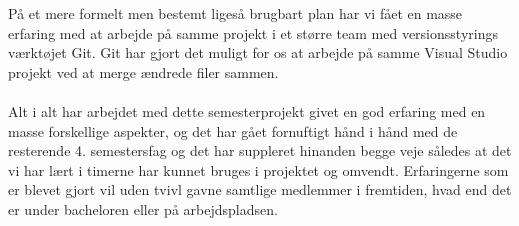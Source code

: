 På et mere formelt men bestemt ligeså brugbart plan har vi fået en masse erfaring med at arbejde på samme projekt i et større team med versionsstyrings værktøjet Git. Git har gjort det muligt for os at arbejde på samme Visual Studio projekt ved at merge ændrede filer sammen. \\

\\
Alt i alt har arbejdet med dette semesterprojekt givet en god erfaring med en masse forskellige aspekter, og det har gået fornuftigt hånd i hånd med de resterende 4. semestersfag og det har suppleret hinanden begge veje således at det vi har lært i timerne har kunnet bruges i projektet og omvendt. Erfaringerne som er blevet gjort vil uden tvivl gavne samtlige medlemmer i fremtiden, hvad end det er under bacheloren eller på arbejdspladsen.








